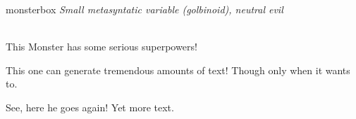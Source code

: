 \documentclass[10pt,twoside,twocolumn]{book}
\begin{document}
\begin{rpgmonsterbox}{monsterbox}
	\textit{Small metasyntatic variable (golbinoid), neutral evil}\\
	\hline
	\basics[%
	armorclass = 12,
	hitpoints  = 16 (3d8 + 3),
	speed      = 50 ft
	]
	\hline
	\stats[
    STR = \stat{12}, %
    DEX = \stat{7}
	]
	\hline
	\details[%
	languages = {Common Lisp, Erlang},
	]
	\hline \\[1mm]
	\begin{rpgmonsteraction}
		This Monster has some serious superpowers!
	\end{rpgmonsteraction}
	\begin{rpgmonsteraction}
		This one can generate tremendous amounts of text! Though only when it wants to.
	\end{rpgmonsteraction}

	\begin{rpgmonsteraction}
    See, here he goes again! Yet more text.
	\end{rpgmonsteraction}
\end{rpgmonsterbox}

\end{document}
